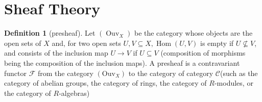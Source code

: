 \documentclass[12pt,a4paper]{book}
\theoremstyle{definition}
\newtheorem{defn}{Definition}[section]
\begin{document}
\section{Sheaf Theory}
\begin{defn}[presheaf]
    Let $\left(\operatorname{Ouv}_X\right)$ be the category whose objects are the open sets of $X$ and, for two open sets $U, V \subseteq X, \operatorname{Hom}(U, V)$ is empty if $U \nsubseteq V$, and consists of the inclusion map $U \rightarrow V$ if $U \subseteq V$ (composition of morphisms being the composition of the inclusion maps).
    A presheaf is a contravariant functor $\mathscr{F}$ from the category $\left(\mathrm{Ouv}_X\right)$ to the category of category $\mathcal{C}$(such as the category of abelian groups, the category of rings, the category of $R$-modules, or the category of $R$-algebras)
\end{defn}
\end{document}
